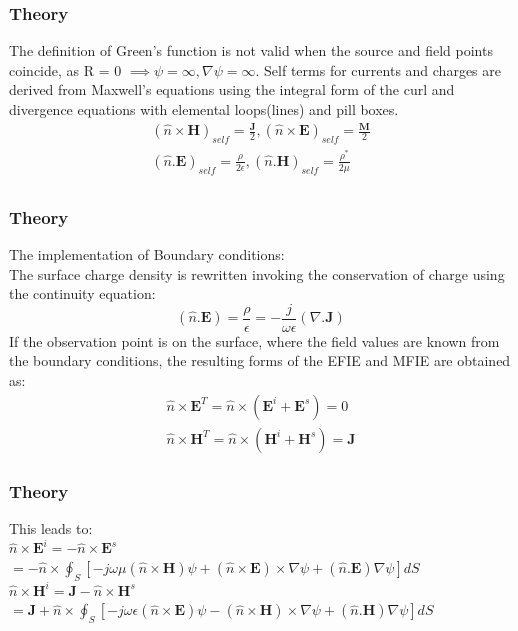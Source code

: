 \documentclass{beamer}
\begin{document}
\begin{frame}
\frametitle{Theory}
The definition of Green's function is not valid when the source and field points coincide, as R = 0 $\implies \psi =\infty, \nabla\psi=\infty$. Self terms for currents and charges are derived from Maxwell's equations using the integral form of the curl and divergence equations with elemental loops(lines) and pill boxes.
\begin{eqnarray}
(\hat{n}\times\textbf{H})_{self} = \frac{\textbf{J}}{2},(\hat{n}\times\textbf{E})_{self} = \frac{\textbf{M}}{2} \\
(\hat{n}.\textbf{E})_{self} = \frac{\rho}{2\epsilon},(\hat{n}.\textbf{H})_{self} = \frac{\rho^*}{2\mu}\\
\end{eqnarray}
\end{frame}
\begin{frame}
\frametitle{Theory}
The implementation of Boundary conditions: \\
The surface charge density is rewritten invoking the conservation of charge using the continuity equation:
\begin{equation}
(\hat{n}.\textbf{E}) = \frac{\rho}{\epsilon} = -\frac{j}{\omega\epsilon}(\nabla.\textbf{J})
\end{equation}
If the observation point is on the surface, where the field values are known from the boundary conditions, the resulting forms of the EFIE and MFIE are obtained as:
\begin{eqnarray}
\hat{n}\times\textbf{E}^T = \hat{n}\times(\textbf{E}^i + \textbf{E}^s) = 0 \\
\hat{n}\times\textbf{H}^T = \hat{n}\times(\textbf{H}^i + \textbf{H}^s) = \textbf{J}
\end{eqnarray}
\end{frame}
\begin{frame}
\frametitle{Theory}
This leads to: \\
$\hat{n}\times\textbf{E}^i=-\hat{n}\times\textbf{E}^s $\\
$=-\hat{n}\times\oint_S[-j\omega\mu(\hat{n}\times\textbf{H})\psi + (\hat{n}\times\textbf{E})\times\nabla\psi + (\hat{n}.\textbf{E})\nabla\psi]dS$\\
$\hat{n}\times\textbf{H}^i = \textbf{J} -\hat{n}\times\textbf{H}^s$\\
$ =\textbf{J} + \hat{n}\times\oint_S[-j\omega\epsilon(\hat{n}\times\textbf{E})\psi - (\hat{n}\times\textbf{H})\times\nabla\psi + (\hat{n}.\textbf{H})\nabla\psi]dS$
\end{frame}
\end{document}
